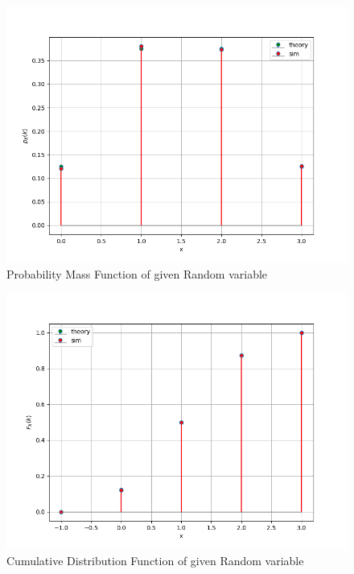 \documentclass[journal]{IEEEtran}
\begin{document}
\begin{figure}[h!]
   \centering
   \includegraphics[width=1\columnwidth]{figs/pmf.png}
    \caption{Probability Mass Function of given Random variable}
\end{figure}
\begin{figure}[h!]
   \centering
   \includegraphics[width=1\columnwidth]{figs/cdf.png}
    \caption{Cumulative Distribution Function of given Random variable}
\end{figure}
\end{document}
